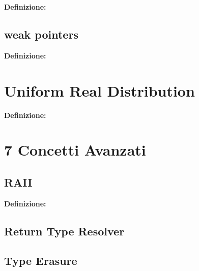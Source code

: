 \textsf{\small \textbf{Definizione: } } \\

\subsection{weak pointers}

\textsf{\small \textbf{Definizione: } } \\


\newpage

\section{Uniform Real Distribution}

\textsf{\small \textbf{Definizione: } } \\



\newpage




\section{7 Concetti Avanzati}

\subsection{RAII}

\textsf{\small \textbf{Definizione: } } \\ %

\subsection{Return Type Resolver}

\subsection{Type Erasure}


